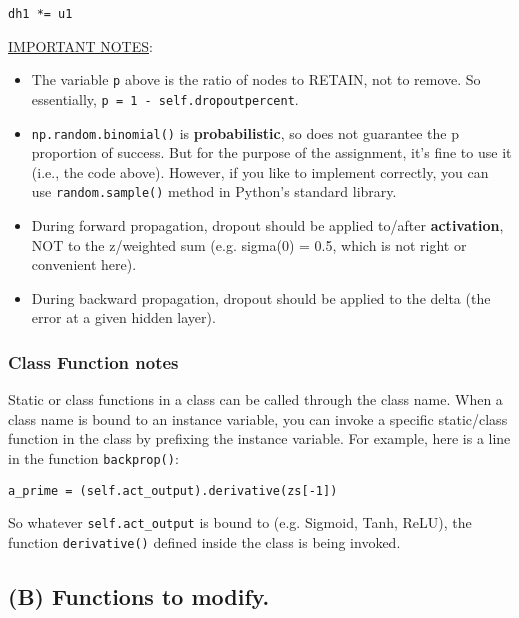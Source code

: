 \documentclass[11pt]{article}
\begin{document}
\begin{itemize}
\begin{enumerate}
\begin{verbatim}
dh1 *= u1 
\end{verbatim}

\uline{IMPORTANT NOTES}:

\begin{itemize}
\item The variable \texttt{p} above is the ratio of nodes to RETAIN, not to remove.   So essentially, \texttt{p = 1 - self.dropoutpercent}.
\item \texttt{np.random.binomial()} is \textbf{probabilistic}, so does not guarantee the p proportion of success.  But for the purpose of the assignment, it's fine to use it (i.e., the code above).  However, if you like to implement correctly, you can use \texttt{random.sample()} method in Python's standard library.
\item During forward propagation, dropout should be applied to/after \textbf{activation}, NOT to the z/weighted sum (e.g. sigma(0) = 0.5, which is not right or convenient here).
\item During backward propagation, dropout should be applied to the delta (the error at a given hidden layer).
\end{itemize}
\end{enumerate}
\end{itemize}



\subsubsection*{Class Function notes}
\label{sec:org77df2bb}

Static or class functions in a class can be called through the class name.  When a class name is bound to an instance variable, you can invoke a specific static/class function in the class by prefixing the instance variable.  For example, here is a line in the function \texttt{backprop()}:

\begin{verbatim}
a_prime = (self.act_output).derivative(zs[-1])
\end{verbatim}

So whatever \texttt{self.act\_output} is bound to (e.g. Sigmoid, Tanh, ReLU), the function \texttt{derivative()} defined inside the class is being invoked.

\subsection*{(B) Functions to modify.}
\label{sec:org9f8af38}
\end{document}
